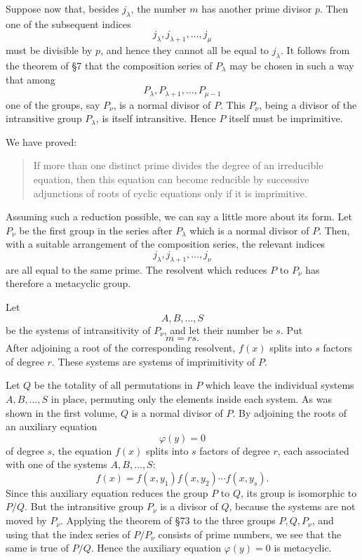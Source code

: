 \documentclass[11pt,a4paper]{book}
\begin{document}
Suppose now that, besides \(j_\lambda\), the number \(m\) has another prime divisor \(p\).  Then one of the subsequent indices
\[
 j_\lambda,j_{\lambda+1},\ldots,j_\mu
\]
must be divisible by \(p\), and hence they cannot all be equal to \(j_\lambda\).  It follows from the theorem of \S 7 that the composition series of \(P_\lambda\) may be chosen in such a way that among
\[
 P_\lambda,P_{\lambda+1},\ldots,P_{\mu-1}
\]
one of the groups, say \(P_\nu\), is a normal divisor of \(P\).  This \(P_\nu\), being a divisor of the intransitive group \(P_\lambda\), is itself intransitive.  Hence \(P\) itself must be imprimitive.

We have proved:

\begin{quote}
If more than one distinct prime divides the degree of an irreducible equation, then this equation can become reducible by successive adjunctions of roots of cyclic equations only if it is imprimitive.
\end{quote}

Assuming such a reduction possible, we can say a little more about its form.  Let \(P_\nu\) be the first group in the series after \(P_\lambda\) which is a normal divisor of \(P\).  Then, with a suitable arrangement of the composition series, the relevant indices
\[
 j_\lambda,j_{\lambda+1},\ldots,j_\nu
\]
are all equal to the same prime.  The resolvent which reduces \(P\) to \(P_\nu\) has therefore a metacyclic group.

Let
\[
 A,B,\ldots,S
\]
be the systems of intransitivity of \(P_\nu\), and let their number be \(s\).  Put
\[
 m=rs.
\]
After adjoining a root of the corresponding resolvent, \(f(x)\) splits into \(s\) factors of degree \(r\).  These systems are systems of imprimitivity of \(P\).

Let \(Q\) be the totality of all permutations in \(P\) which leave the individual systems \(A,B,\ldots,S\) in place, permuting only the elements inside each system.  As was shown in the first volume, \(Q\) is a normal divisor of \(P\).  By adjoining the roots of an auxiliary equation
\[
 \varphi(y)=0
\]
of degree \(s\), the equation \(f(x)\) splits into \(s\) factors of degree \(r\), each associated with one of the systems \(A,B,\ldots,S\):
\[
 f(x)=f(x,y_1)f(x,y_2)\cdots f(x,y_s).
\]
Since this auxiliary equation reduces the group \(P\) to \(Q\), its group is isomorphic to \(P/Q\).  But the intransitive group \(P_\nu\) is a divisor of \(Q\), because the systems are not moved by \(P_\nu\).  Applying the theorem of \S 73 to the three groups \(P,Q,P_\nu\), and using that the index series of \(P/P_\nu\) consists of prime numbers, we see that the same is true of \(P/Q\).  Hence the auxiliary equation \(\varphi(y)=0\) is metacyclic.
\end{document}

